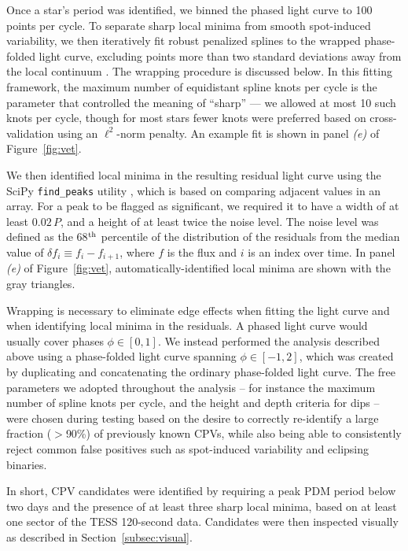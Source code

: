 \documentclass[11pt,twocolumn,tighten]{aastex63}
\begin{document}
Once a star's period was identified, we binned the phased light curve
to 100 points per cycle.  To separate sharp local minima from smooth
spot-induced variability, we then iteratively fit robust penalized
splines to the wrapped phase-folded light curve, excluding points more
than two standard deviations away from the local continuum
\citep{2019AJ....158..143H}.  The wrapping procedure is discussed
below.  In this fitting framework, the maximum number of equidistant
spline knots per cycle is the parameter that controlled the meaning of
``sharp'' --- we allowed at most 10 such knots per cycle, though for
most stars fewer knots were preferred based on cross-validation using
an $\ell^2$-norm penalty.  An example fit is shown in panel {\it (e)}
of Figure~\ref{fig:vet}.

We then identified local minima in the resulting residual light curve
using the SciPy \texttt{find\_peaks} utility
\citep{2020NatMe..17..261V}, which is based on comparing adjacent
values in an array.  For a peak to be flagged as significant, we
required it to have a width of at least $0.02\,P$, and a height of at
least twice the noise level.  The noise level was defined
as the 68$^{\rm th}$ percentile of the distribution of the residuals
from the median value of $\delta f_i \equiv f_i - f_{i+1}$, where $f$
is the flux and $i$ is an index over time.
In panel {\it (e)} of Figure~\ref{fig:vet}, automatically-identified
local minima are shown with the gray triangles.

Wrapping is necessary to eliminate edge effects when fitting the light
curve and when identifying local minima in the residuals.  A phased
light curve would usually cover phases $\phi \in [ 0,1 ]$.  We instead
performed the analysis described above using a phase-folded light
curve spanning $\phi \in [-1,2 ]$, which was created by duplicating
and concatenating the ordinary phase-folded light curve.  The free
parameters we adopted throughout the analysis -- for instance the
maximum number of spline knots per cycle, and the height and depth
criteria for dips -- were chosen during testing based on the desire to
correctly re-identify a large fraction ($>$90\%) of previously known
CPVs, while also being able to consistently reject common false
positives such as spot-induced variability and
eclipsing binaries.

In short, CPV candidates were identified by requiring a peak PDM period
below two days and the presence of at least three sharp local minima,
based on at least one sector of the TESS 120-second data. Candidates
were then inspected visually as described in
Section~\ref{subsec:visual}.
\end{document}
